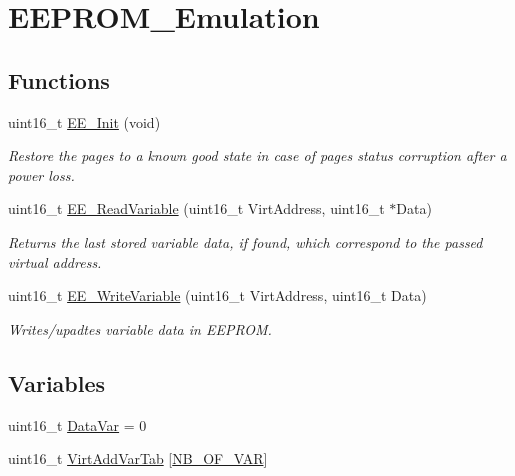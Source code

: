 \hypertarget{group___e_e_p_r_o_m___emulation}{}\section{E\+E\+P\+R\+O\+M\+\_\+\+Emulation}
\label{group___e_e_p_r_o_m___emulation}
\subsection*{Functions}
\begin{DoxyCompactItemize}
\item 
uint16\+\_\+t \hyperlink{group___e_e_p_r_o_m___emulation_ga83834957567411c76bb7f659cf8a1a38}{E\+E\+\_\+\+Init} (void)
\begin{DoxyCompactList}\small\item\em Restore the pages to a known good state in case of page\textquotesingle{}s status corruption after a power loss. \end{DoxyCompactList}\item 
uint16\+\_\+t \hyperlink{group___e_e_p_r_o_m___emulation_ga0776e2e16f54d3a675e4f2f401703a85}{E\+E\+\_\+\+Read\+Variable} (uint16\+\_\+t Virt\+Address, uint16\+\_\+t $\ast$Data)
\begin{DoxyCompactList}\small\item\em Returns the last stored variable data, if found, which correspond to the passed virtual address. \end{DoxyCompactList}\item 
uint16\+\_\+t \hyperlink{group___e_e_p_r_o_m___emulation_ga516e9ced7438b9452c72884aa1df5915}{E\+E\+\_\+\+Write\+Variable} (uint16\+\_\+t Virt\+Address, uint16\+\_\+t Data)
\begin{DoxyCompactList}\small\item\em Writes/upadtes variable data in E\+E\+P\+R\+O\+M. \end{DoxyCompactList}\end{DoxyCompactItemize}
\subsection*{Variables}
\begin{DoxyCompactItemize}
\item 
uint16\+\_\+t \hyperlink{group___e_e_p_r_o_m___emulation_ga3d172691f05ea6e584b3d19f5900333c}{Data\+Var} = 0
\item 
uint16\+\_\+t \hyperlink{group___e_e_p_r_o_m___emulation_ga1fb74b26daf6fdfa3dc85e4232ef4769}{Virt\+Add\+Var\+Tab} \mbox{[}\hyperlink{eeprom_8h_a8bae73a7ce70b5cae64c6e0d485daa2f}{N\+B\+\_\+\+O\+F\+\_\+\+V\+A\+R}\mbox{]}
\end{DoxyCompactItemize}


